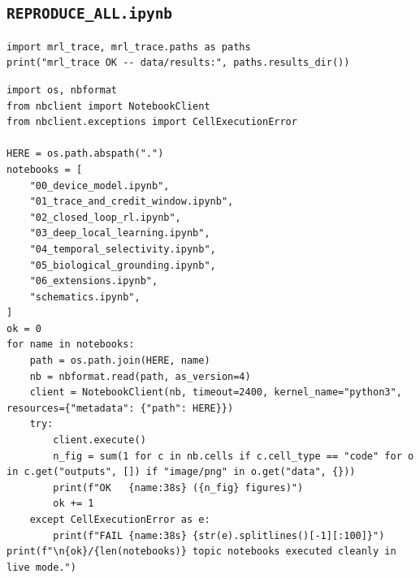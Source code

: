 \subsection{\texttt{REPRODUCE\_ALL.ipynb}}

\begin{lstlisting}[caption={REPRODUCE\_ALL.ipynb code cell 1},label={lst:mrl-nb-REPRODUCE-ALL-1}]
import mrl_trace, mrl_trace.paths as paths
print("mrl_trace OK -- data/results:", paths.results_dir())
\end{lstlisting}

\begin{lstlisting}[caption={REPRODUCE\_ALL.ipynb code cell 2},label={lst:mrl-nb-REPRODUCE-ALL-2}]
import os, nbformat
from nbclient import NotebookClient
from nbclient.exceptions import CellExecutionError

HERE = os.path.abspath(".")
notebooks = [
    "00_device_model.ipynb",
    "01_trace_and_credit_window.ipynb",
    "02_closed_loop_rl.ipynb",
    "03_deep_local_learning.ipynb",
    "04_temporal_selectivity.ipynb",
    "05_biological_grounding.ipynb",
    "06_extensions.ipynb",
    "schematics.ipynb",
]
ok = 0
for name in notebooks:
    path = os.path.join(HERE, name)
    nb = nbformat.read(path, as_version=4)
    client = NotebookClient(nb, timeout=2400, kernel_name="python3", resources={"metadata": {"path": HERE}})
    try:
        client.execute()
        n_fig = sum(1 for c in nb.cells if c.cell_type == "code" for o in c.get("outputs", []) if "image/png" in o.get("data", {}))
        print(f"OK   {name:38s} ({n_fig} figures)")
        ok += 1
    except CellExecutionError as e:
        print(f"FAIL {name:38s} {str(e).splitlines()[-1][:100]}")
print(f"\n{ok}/{len(notebooks)} topic notebooks executed cleanly in live mode.")
\end{lstlisting}
